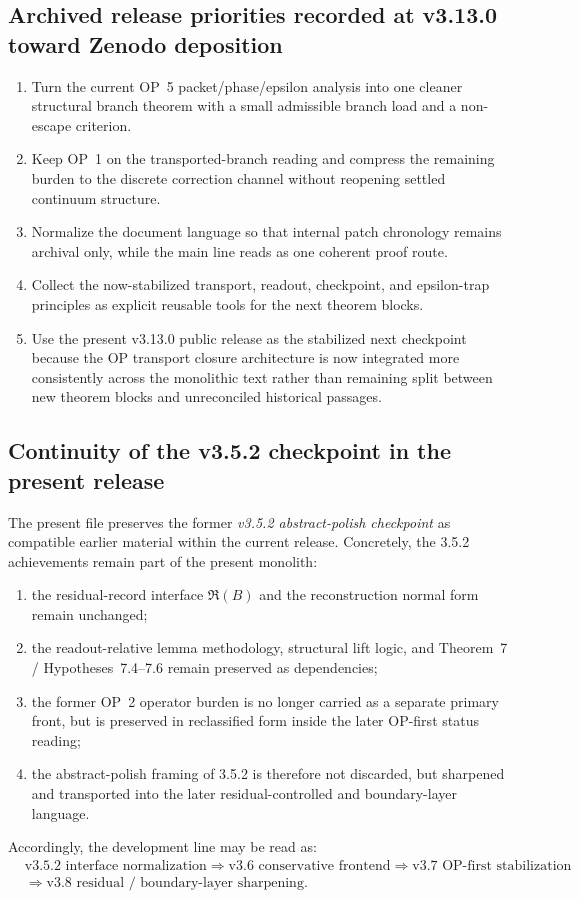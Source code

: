 \subsection*{Archived release priorities recorded at v3.13.0 toward Zenodo deposition}
\begin{enumerate}[leftmargin=2em]
  \item Turn the current OP~5 packet/phase/epsilon analysis into one cleaner structural branch theorem with a small admissible branch load and a non-escape criterion.
  \item Keep OP~1 on the transported-branch reading and compress the remaining burden to the discrete correction channel without reopening settled continuum structure.
  \item Normalize the document language so that internal patch chronology remains archival only, while the main line reads as one coherent proof route.
  \item Collect the now-stabilized transport, readout, checkpoint, and epsilon-trap principles as explicit reusable tools for the next theorem blocks.
  \item Use the present v3.13.0 public release as the stabilized next checkpoint because the OP transport closure architecture is now integrated more consistently across the monolithic text rather than remaining split between new theorem blocks and unreconciled historical passages.
\end{enumerate}

\subsection*{Continuity of the v3.5.2 checkpoint in the present release}
The present file preserves the former \emph{v3.5.2 abstract-polish checkpoint} as compatible earlier material within the current release.
Concretely, the 3.5.2 achievements remain part of the present monolith:
\begin{enumerate}[leftmargin=2em,label=(\roman*)]
  \item the residual-record interface \(\mathfrak R(B)\) and the reconstruction normal form remain unchanged;
  \item the readout-relative lemma methodology, structural lift logic, and Theorem~7 / Hypotheses~7.4--7.6 remain preserved as dependencies;
  \item the former OP~2 operator burden is no longer carried as a separate primary front, but is preserved in reclassified form inside the later OP-first status reading;
  \item the abstract-polish framing of 3.5.2 is therefore not discarded, but sharpened and transported into the later residual-controlled and boundary-layer language.
\end{enumerate}
Accordingly, the development line may be read as:
\[
\begin{aligned}
&\text{v3.5.2 interface normalization}
\Longrightarrow
\text{v3.6 conservative frontend}
\Longrightarrow
\text{v3.7 OP-first stabilization}\\[0.2em]
&\Longrightarrow
\text{v3.8 residual / boundary-layer sharpening}.
\end{aligned}
\]


